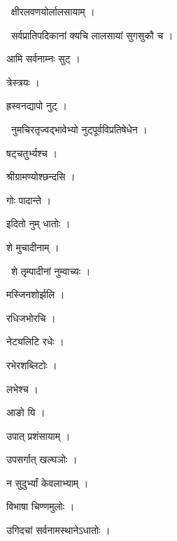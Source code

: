 \documentclass[10pt, openany, oneside]{book}
\begin{document}
\par\noindent\hspace{1.5em}{\vps वा॰}~{\qt क्षीरलवणयोर्लालसायाम् ।}

\par\noindent\hspace{1.5em}{\vps वा॰}~{\qt सर्वप्रातिपदिकानां क्यचि लालसायां सुगसुकौ च ।}

\noindent आमि सर्वनाम्नः सुट् ।

\noindent त्रेस्त्रयः ।

\noindent ह्रस्वनद्यापो नुट् ।

\par\noindent\hspace{1.5em}{\vps वा॰}~{\qt नुमचिरतृज्वद्भावेभ्यो नुट्पूर्वविप्रतिषेधेन ।}

\noindent षट्चतुर्भ्यश्च ।

\noindent श्रीग्रामण्योश्छन्दसि ।

\noindent गोः पादान्ते ।

\noindent इदितो नुम् धातोः ।

\noindent शे मुचादीनाम् ।

\par\noindent\hspace{1.5em}{\vps वा॰}~{\qt शे तृम्पादीनां नुम्वाच्यः ।}

\noindent मस्जिनशोर्झलि ।

\noindent रधिजभोरचि ।

\noindent नेट्यलिटि रधेः ।

\noindent रभेरशब्लिटोः ।

\noindent लभेश्च ।

\noindent आङो यि ।

\noindent उपात् प्रशंसायाम् ।

\noindent उपसर्गात् खल्घञोः ।

\noindent न सुदुर्भ्यां केवलाभ्याम् ।

\noindent विभाषा चिण्णमुलोः ।

\noindent उगिदचां सर्वनामस्थानेऽधातोः ।
\end{document}
